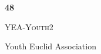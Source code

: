 \documentclass[extrafontsizes,30pt]{memoir}
\begin{document}
\begin{center}
\mbox{}
\vspace{1in}

{\Huge \textbf{ \TeamID}}

\vspace{1in}

{\Large \textsc{\TeamName}}

\vspace{1in}

{\large \SchoolName}
\end{center}

\newpage



\renewcommand{\TeamID}{48}
\renewcommand{\TeamName}{YEA-Youth2}
\renewcommand{\SchoolName}{Youth Euclid Association}

\begin{center}
\mbox{}
\vspace{1in}

{\Huge \textbf{ \TeamID}}

\vspace{1in}

{\Large \textsc{\TeamName}}

\vspace{1in}

{\large \SchoolName}
\end{center}
\end{document}
